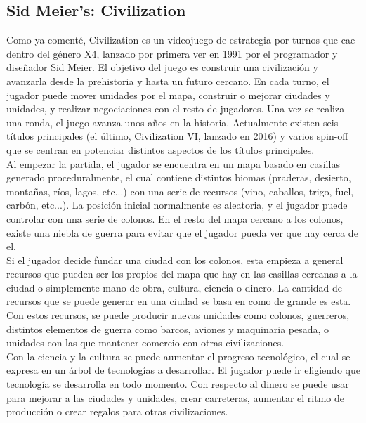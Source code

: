 \subsection{Sid Meier's: Civilization}\label{subsec:civ}

Como ya comenté, Civilization es un videojuego de estrategia por turnos que cae dentro del género X4, lanzado por primera ver en 1991 por el programador y diseñador Sid Meier. El objetivo del juego es construir una civilización y avanzarla desde la prehistoria y hasta un futuro cercano. En cada turno, el jugador puede mover unidades por el mapa, construir o mejorar ciudades y unidades, y realizar negociaciones con el resto de jugadores. Una vez se realiza una ronda, el juego avanza unos años en la historia. Actualmente existen seis títulos principales (el último, Civilization VI, lanzado en 2016) y varios spin-off que se centran en potenciar distintos aspectos de los títulos principales. \\

Al empezar la partida, el jugador se encuentra en un mapa basado en casillas generado proceduralmente, el cual contiene distintos biomas (praderas, desierto, montañas, ríos, lagos, etc...) con una serie de recursos (vino, caballos, trigo, fuel, carbón, etc...). La posición inicial normalmente es aleatoria, y el jugador puede controlar con una serie de colonos. En el resto del mapa cercano a los colonos, existe una niebla de guerra para evitar que el jugador pueda ver que hay cerca de el. \\

Si el jugador decide fundar una ciudad con los colonos, esta empieza a general recursos que pueden ser los propios del mapa que hay en las casillas cercanas a la ciudad o simplemente mano de obra, cultura, ciencia o dinero. La cantidad de recursos que se puede generar en una ciudad se basa en como de grande es esta. Con estos recursos, se puede producir nuevas unidades como colonos, guerreros, distintos elementos de guerra como barcos, aviones y maquinaria pesada, o unidades con las que mantener comercio con otras civilizaciones. \\

Con la ciencia y la cultura se puede aumentar el progreso tecnológico, el cual se expresa en un árbol de tecnologías a desarrollar. El jugador puede ir eligiendo que tecnología se desarrolla en todo momento. Con respecto al dinero se puede usar para mejorar a las ciudades y unidades, crear carreteras, aumentar el ritmo de producción o crear regalos para otras civilizaciones. \\

